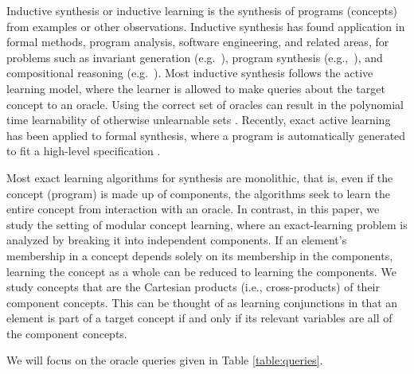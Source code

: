 
Inductive synthesis or inductive learning 
is the synthesis of programs (concepts) from examples or other observations. 
Inductive synthesis has found application in formal methods, program analysis,
software engineering, and related areas, for problems such as 
invariant generation (e.g.~\cite{garg2014ice}),
program synthesis (e.g.,~\cite{solar2006combinatorial}),
and compositional reasoning (e.g.~\cite{cobleigh2003learning}).
Most inductive synthesis follows the active learning model, where the
learner is allowed to make queries about the target concept to an oracle. 
Using the correct set of oracles can result in the polynomial time learnability of otherwise unlearnable sets \cite{angluin1988queries}. 
Recently, exact active learning has been applied to formal synthesis, where a program is automatically generated to fit a high-level specification \cite{jha2017theory}. 

Most exact learning algorithms for synthesis are monolithic, that is, even
if the concept (program) is made up of components, the algorithms seek to
learn the entire concept from interaction with an oracle.
In contrast, in this paper, we study the setting of modular concept learning,
where an exact-learning problem is analyzed by breaking it into independent components. 
If an element's membership in a concept depends solely on its membership in the components, learning the concept as a whole can be reduced to learning the components. 
We study concepts that are the Cartesian products (i.e., cross-products) of their component concepts.  
This can be thought of as learning conjunctions in that an element is part of a target concept if and only if its relevant variables are all of the component concepts. 

We will focus on the oracle queries given in Table \ref{table:queries}.

